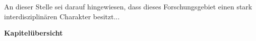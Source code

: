 An dieser Stelle sei darauf hingewiesen, dass dieses Forschungsgebiet einen stark interdisziplinären Charakter besitzt...


\newpage
\textbf{Kapitelübersicht}\\\\ 